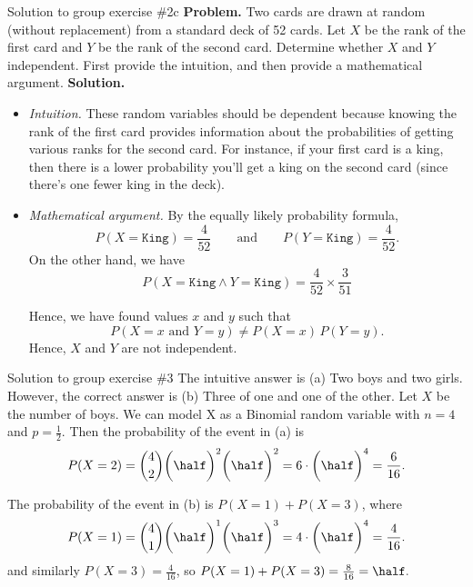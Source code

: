 \documentclass[10pt]{beamer}
\begin{document}
\begin{frame}{Solution to group exercise \#2c}
\small 
\textbf{Problem.} Two cards are drawn at random (without replacement) from a standard deck of 52 cards. Let $X$ be the rank of the first card and $Y$ be the rank of the second card. Determine whether $X$ and $Y$ independent. First provide the intuition, and then provide a mathematical argument.  
\vfill 
\vspace{-.2cm}
\textbf{Solution.}
\vspace{-.2cm}
\begin{itemize}
\item \textit{Intuition.} These random variables should be dependent because knowing the rank of the first card provides information about the probabilities of getting various ranks for the second card.  For instance, if your first card is a king, then there is a lower probability you'll get a king on the second card (since there's one fewer king in the deck).
\vfill 
\item \textit{Mathematical argument.}  By the equally likely probability formula,
\[P(X=\texttt{King}) = \frac{4}{52} \qquad \text{and} \qquad  P(Y=\texttt{King}) = \frac{4}{52} .\]
On the other hand, we have
\[ P(X=\texttt{King} \land  Y=\texttt{King}) = \frac{4}{52} \times \frac{3}{51}\]

Hence, we have found values $x$ and $y$ such that
\[P(X=x \text{ and } Y=y) \neq P(X=x) \, P(Y=y). \]
Hence, $X$ and $Y$ are not independent.


\end{itemize}

\end{frame}




\begin{frame}{Solution to group exercise \#3}
The intuitive answer is (a) Two boys and two girls.  However, the correct answer is (b) Three of one and one of the other.
\vfill
Let $X$ be the number of boys.  We can model X as a Binomial random variable with $n=4$ and $p=\frac{1}{2}$.
\vfill 
Then the probability of the event in (a) is
\[P(X=2) = \binom{4}{2} \bigg(\half\bigg)^2 \bigg(\half\bigg)^2 = 6 \cdot \bigg(\half\bigg)^4 = \frac{6}{16}.\]

The probability of the event in (b) is $P(X=1)+P(X=3)$, where
\[P(X=1) = \binom{4}{1} \bigg(\half\bigg)^1 \bigg(\half\bigg)^3 = 4 \cdot \bigg(\half\bigg)^4 = \frac{4}{16}.\]
and similarly $P(X=3) = \frac{4}{16}$, so $P(X=1)+P(X=3)=\frac{8}{16}=\half.$

\end{frame}
\end{document}
